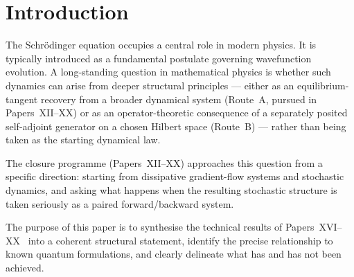 \documentclass[12pt]{article}
\newcommand{\HW}{H_{\mathrm{W}}}
\begin{document}
\begin{abstract}
A geometric-quantum section (Section~\ref{sec:geometric}) makes explicit the K\"ahler structure at the equilibrium tangent \emph{under a sector-subspace invariance hypothesis}: the projective state manifold is $\mathbb{CP}^{N-1}$, the linearised Schr\"odinger flow is a Hamiltonian flow on this manifold with respect to the imaginary-part-of-inner-product symplectic form, and the induced projective action of $U(N)$ factors through $\mathrm{PU}(N)$ and acts by K\"ahler isometries. This is standard geometric quantum mechanics \citep{AshtekarSchilling1999,KobayashiNomizu1969} applied to the invariant finite-dimensional subspace; the closure-derived content is the identification of $\HW$ as the effective Hamiltonian on that subspace. Paper~XXX uses this equilibrium-tangent structure as an input to its K\"ahler-uniqueness argument for the Born rule via Petz's theorem. The full nonlinear dynamics of Route~A remains non-unitary, as previously established; Route~B's unitarity is the cascade-projective statement valid at the H${}_4$ rung.
\end{abstract}

\section{Introduction}\label{sec:intro}

The Schr\"odinger equation occupies a central role in modern physics. It is typically introduced as a fundamental postulate governing wavefunction evolution. A long-standing question in mathematical physics is whether such dynamics can arise from deeper structural principles --- either as an equilibrium-tangent recovery from a broader dynamical system (Route~A, pursued in Papers~XII--XX) or as an operator-theoretic consequence of a separately posited self-adjoint generator on a chosen Hilbert space (Route~B) --- rather than being taken as the starting dynamical law.

The closure programme (Papers~XII--XX) approaches this question from a specific direction: starting from dissipative gradient-flow systems and stochastic dynamics, and asking what happens when the resulting stochastic structure is taken seriously as a paired forward/backward system.

The purpose of this paper is to synthesise the technical results of Papers~XVI--XX~\citep{SmartXVI, SmartXVII, SmartXVIII, SmartXIX, SmartXX} into a coherent structural statement, identify the precise relationship to known quantum formulations, and clearly delineate what has and has not been achieved.
\end{document}
